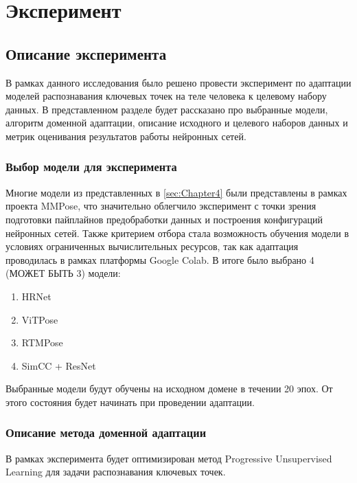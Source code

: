 \section{Эксперимент}
\label{sec:Chapter5} 

\subsection{Описание эксперимента}


В рамках данного исследования было решено провести эксперимент по адаптации моделей распознавания ключевых точек на теле человека к целевому набору данных. В представленном разделе будет рассказано про выбранные модели, алгоритм доменной адаптации, описание исходного и целевого наборов данных и метрик оценивания результатов работы нейронных сетей.

\subsubsection*{Выбор модели для эксперимента}

Многие модели из представленных в \autoref{sec:Chapter4} были представлены в рамках проекта MMPose, что значительно облегчило эксперимент с точки зрения подготовки пайплайнов предобработки данных и построения конфигураций нейронных сетей. Также критерием отбора стала возможность обучения модели в условиях ограниченных вычислительных ресурсов, так как адаптация проводилась в рамках платформы Google Colab. В итоге было выбрано 4 (МОЖЕТ БЫТЬ 3) модели:
\begin{enumerate}
\item HRNet
\item ViTPose
\item RTMPose
\item SimCC + ResNet
\end{enumerate}

Выбранные модели будут обучены на исходном домене в течении 20 эпох. От этого состояния будет начинать при проведении адаптации.

\subsubsection*{Описание метода доменной адаптации}

В рамках эксперимента будет оптимизирован метод Progressive Unsupervised Learning \cite{pul} для задачи распознавания ключевых точек. 

